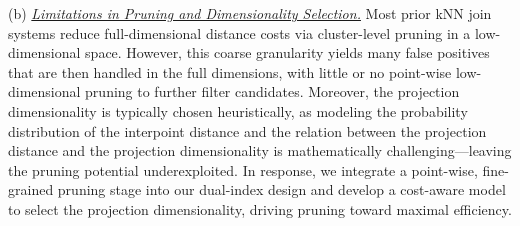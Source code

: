 \noindent (b) \underline{\emph{Limitations in Pruning and Dimensionality Selection.}} Most prior kNN join systems reduce full-dimensional distance costs via cluster-level pruning in a low-dimensional space. However, this coarse granularity yields many false positives that are then handled in the full dimensions, with little or no point-wise low-dimensional pruning to further filter candidates. Moreover, the projection dimensionality is typically chosen heuristically, as modeling the probability distribution of the interpoint distance and the relation between the projection distance and the projection dimensionality is mathematically challenging—leaving the pruning potential underexploited. In response, we integrate a point-wise, fine-grained pruning stage into our dual-index design and develop a cost-aware model to select the projection dimensionality, driving pruning toward maximal efficiency.
    
    



